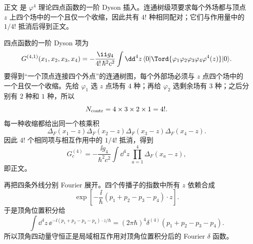 \begin{derivation}

正文 是 $\varphi^4$ 理论四点函数的一阶 Dyson 插入。连通树级项要求每个外场都与顶点 $z$ 上四个场中的一个且仅一个收缩，因此共有 $4!$ 种相同配对；它们与作用量中的 $1/4!$ 抵消后得到正文。



四点函数的一阶 Dyson 项为
\begin{equation*}
 G^{(4,1)}(x_1,x_2,x_3,x_4)
 =-\frac{\ii g_4}{4!\,\hbar^2c^2}
 \int\dd^4 z\,
 \langle0|\Tord\{\varphi_1\varphi_2\varphi_3\varphi_4\varphi^4(z)\}|0\rangle .
\end{equation*}
要得到“一个顶点连接四个外点”的连通树图，每个外部场必须与 $z$ 点四个场中的一个且仅一个收缩。先给 $\varphi_1$ 选 $z$ 点场有 $4$ 种；再给 $\varphi_2$ 选剩余场有 $3$ 种；之后分别有 $2$ 种和 $1$ 种，所以
\begin{equation*}
 N_{\rm contr}=4\times3\times2\times1=4!.
\end{equation*}
每一种收缩都给出同一个核乘积
\begin{equation*}
 \Delta_F(x_1-z)\Delta_F(x_2-z)\Delta_F(x_3-z)\Delta_F(x_4-z).
\end{equation*}
因此 $4!$ 个相同项与相互作用中的 $1/4!$ 抵消，得到
\begin{equation*}
 G_c^{(4)}
 =-\frac{\ii g_4}{\hbar^2c^2}
 \int\dd^4 z\,\prod_{a=1}^4\Delta_F(x_a-z),
\end{equation*}
即正文。

再把四条外线分别 Fourier 展开。四个传播子的指数中所有 $z$ 依赖合成
\begin{equation*}
 \exp\!\left[-\frac{\ii}{\hbar}
 (p_1+p_2-p_3-p_4)\cdot z\right].
\end{equation*}
于是顶角位置积分给
\begin{equation*}
 \int\dd^4 z\,
 \ee^{-\ii(p_1+p_2-p_3-p_4)\cdot z/\hbar}
 =(2\pi\hbar)^4\delta^{(4)}(p_1+p_2-p_3-p_4).
\end{equation*}
所以顶角四动量守恒正是局域相互作用对顶角位置积分后的 Fourier $\delta$ 函数。
\end{derivation}

